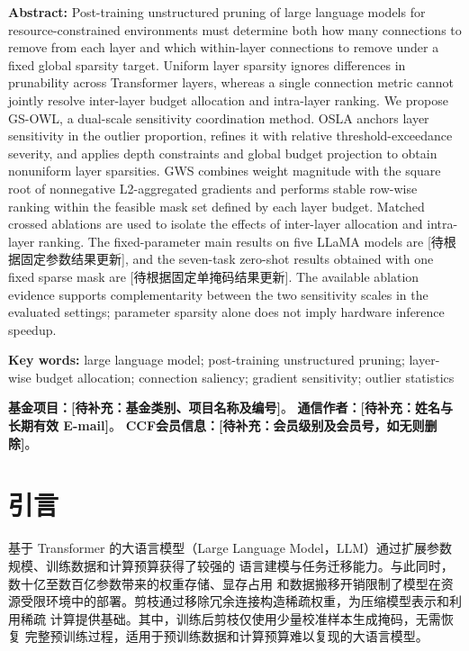 \documentclass[UTF8,fontset=fandol]{ctexart}
\newcommand{\placeholder}[1]{\textbf{[待补充：#1]}}
\begin{document}
\vspace{4pt}
\noindent\textbf{Abstract:}
Post-training unstructured pruning of large language models for resource-constrained environments must determine both how many connections to remove from each layer and which within-layer connections to remove under a fixed global sparsity target. Uniform layer sparsity ignores differences in prunability across Transformer layers, whereas a single connection metric cannot jointly resolve inter-layer budget allocation and intra-layer ranking. We propose GS-OWL, a dual-scale sensitivity coordination method. OSLA anchors layer sensitivity in the outlier proportion, refines it with relative threshold-exceedance severity, and applies depth constraints and global budget projection to obtain nonuniform layer sparsities. GWS combines weight magnitude with the square root of nonnegative L2-aggregated gradients and performs stable row-wise ranking within the feasible mask set defined by each layer budget. Matched crossed ablations are used to isolate the effects of inter-layer allocation and intra-layer ranking. The fixed-parameter main results on five LLaMA models are [待根据固定参数结果更新], and the seven-task zero-shot results obtained with one fixed sparse mask are [待根据固定单掩码结果更新]. The available ablation evidence supports complementarity between the two sensitivity scales in the evaluated settings; parameter sparsity alone does not imply hardware inference speedup.

\noindent\textbf{Key words:}
large language model; post-training unstructured pruning; layer-wise budget allocation; connection saliency; gradient sensitivity; outlier statistics

\vspace{6pt}
\noindent{}
\textbf{基金项目：}\placeholder{基金类别、项目名称及编号}。\quad
\textbf{通信作者：}\placeholder{姓名与长期有效 E-mail}。\quad
\textbf{CCF会员信息：}\placeholder{会员级别及会员号，如无则删除}。
\vspace{4pt}
\endgroup
\vspace{8pt}

\section{引言}

基于 Transformer 的大语言模型（Large Language Model，LLM）通过扩展参数规模、训练数据和计算预算获得了较强的
语言建模与任务迁移能力\cite{llama,llama2,transformer}。与此同时，数十亿至数百亿参数带来的权重存储、显存占用
和数据搬移开销限制了模型在资源受限环境中的部署。剪枝通过移除冗余连接构造稀疏权重，为压缩模型表示和利用稀疏
计算提供基础\cite{obd,obs,han2015,deepcompression}。其中，训练后剪枝仅使用少量校准样本生成掩码，无需恢复
完整预训练过程，适用于预训练数据和计算预算难以复现的大语言模型。
\end{document}
